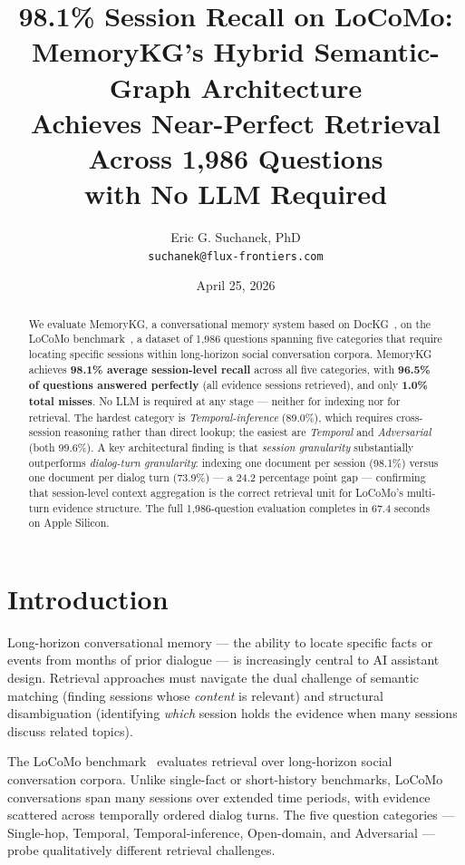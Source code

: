 \documentclass[11pt,a4paper]{article}
\title{\textbf{98.1\% Session Recall on LoCoMo:}\\
       \large MemoryKG's Hybrid Semantic-Graph Architecture\\
       Achieves Near-Perfect Retrieval Across 1,986 Questions\\
       with No LLM Required}
\author{Eric G. Suchanek, PhD\\
        \texttt{suchanek@flux-frontiers.com}}
\date{April 25, 2026}
\begin{document}
\maketitle

\begin{abstract}
We evaluate MemoryKG, a conversational memory system based on
DocKG~\citep{dockg2026}, on the LoCoMo benchmark~\citep{maharana2024locomo},
a dataset of 1,986 questions spanning five categories that require locating
specific sessions within long-horizon social conversation corpora.
MemoryKG achieves \textbf{98.1\% average session-level recall} across all
five categories, with \textbf{96.5\% of questions answered perfectly} (all
evidence sessions retrieved), and only \textbf{1.0\% total misses}.
No LLM is required at any stage --- neither for indexing nor for retrieval.
The hardest category is \textit{Temporal-inference} (89.0\%), which requires
cross-session reasoning rather than direct lookup; the easiest are
\textit{Temporal} and \textit{Adversarial} (both 99.6\%).
A key architectural finding is that \textit{session granularity} substantially
outperforms \textit{dialog-turn granularity}: indexing one document per session
(98.1\%) versus one document per dialog turn (73.9\%) --- a 24.2 percentage
point gap --- confirming that session-level context aggregation is the correct
retrieval unit for LoCoMo's multi-turn evidence structure.
The full 1,986-question evaluation completes in 67.4 seconds on Apple Silicon.
\end{abstract}

\section{Introduction}
\label{sec:intro}

Long-horizon conversational memory --- the ability to locate specific facts
or events from months of prior dialogue --- is increasingly central to
AI assistant design.
Retrieval approaches must navigate the dual challenge of semantic matching
(finding sessions whose \emph{content} is relevant) and structural
disambiguation (identifying \emph{which} session holds the evidence when many
sessions discuss related topics).

The LoCoMo benchmark~\citep{maharana2024locomo} evaluates retrieval over
long-horizon social conversation corpora.
Unlike single-fact or short-history benchmarks, LoCoMo conversations span
many sessions over extended time periods, with evidence scattered across
temporally ordered dialog turns.
The five question categories --- Single-hop, Temporal, Temporal-inference,
Open-domain, and Adversarial --- probe qualitatively different retrieval
challenges.
\end{document}
